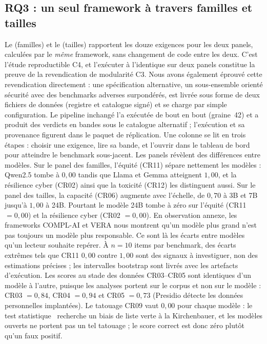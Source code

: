 \documentclass[10pt,conference]{IEEEtran}
\begin{document}
\subsection{RQ3 : un seul framework à travers familles et tailles}
Le  (familles) et le  (tailles) rapportent les douze exigences pour les deux panels, calculées par le \emph{même} framework, sans changement de code entre les deux.
C'est l'étude reproductible C4, et l'exécuter à l'identique sur deux panels constitue la preuve de la revendication de modularité C3.
Nous avons également éprouvé cette revendication directement : une spécification alternative, un sous-ensemble orienté sécurité avec des benchmarks adverses surpondérés, est livrée sous forme de deux fichiers de données (registre et catalogue signé) et se charge par simple configuration.
Le pipeline inchangé l'a exécutée de bout en bout (graine~42) et a produit des verdicts en bandes sous le catalogue alternatif ; l'exécution et sa provenance figurent dans le paquet de réplication.
Une colonne se lit en trois étapes : choisir une exigence, lire sa bande, et l'ouvrir dans le tableau de bord pour atteindre le benchmark sous-jacent.
Les panels révèlent des différences entre modèles.
Sur le panel des familles, l'équité (CR11) sépare nettement les modèles : Qwen2.5 tombe à $0{,}00$ tandis que Llama et Gemma atteignent $1{,}00$, et la résilience cyber (CR02) ainsi que la toxicité (CR12) les distinguent aussi.
Sur le panel des tailles, la capacité (CR06) augmente avec l'échelle, de $0{,}70$ à 3B et 7B jusqu'à $1{,}00$ à 24B.
Pourtant le modèle 24B tombe à zéro sur l'équité (CR11 $=0{,}00$) et la résilience cyber (CR02 $=0{,}00$).
En observation annexe, les frameworks COMPL-AI et VERA nous montrent qu'un modèle plus grand n'est pas toujours un modèle plus responsable.
Ce sont là les écarts entre modèles qu'un lecteur souhaite repérer.
À $n{=}10$ items par benchmark, des écarts extrêmes tels que CR11 $0{,}00$ contre $1{,}00$ sont des signaux à investiguer, non des estimations précises ; les intervalles bootstrap sont livrés avec les artefacts d'exécution.
Les scores au stade des données CR03--CR05 sont identiques d'un modèle à l'autre, puisque les analyses portent sur le corpus et non sur le modèle : CR03 $=0{,}84$, CR04 $=0{,}94$ et CR05 $=0{,}73$ (Presidio détecte les données personnelles implantées).
Le tatouage CR09 vaut $0{,}00$ pour chaque modèle : le test statistique~\cite{kirchenbauer2023watermark} recherche un biais de liste verte à la Kirchenbauer, et les modèles ouverts ne portent pas un tel tatouage ; le score correct est donc zéro plutôt qu'un faux positif.
\end{document}
